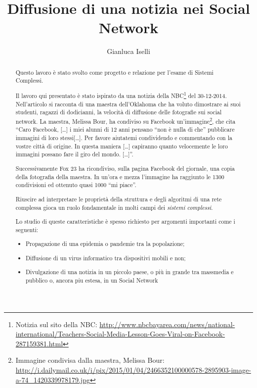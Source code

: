 \documentclass{llncs}
\begin{document}
\title{Diffusione di una notizia nei Social Network}
\author{Gianluca Iselli}

\maketitle

\begin{abstract}

Questo lavoro è stato svolto come progetto e relazione per l’esame di Sistemi Complessi.

Il lavoro qui presentato è stato ispirato da una notizia della 
NBC\footnote{\scriptsize Notizia sul sito della NBC: \url{http://www.nbcbayarea.com/news/national-international/Teachers-Social-Media-Lesson-Goes-Viral-on-Facebook-287159381.html}}
del 30-12-2014.
Nell'articolo si racconta di una maestra dell'Oklahoma che ha voluto dimostrare
ai suoi studenti, ragazzi di dodicianni, la velocità di diffusione delle fotografie sui social network. 
La maestra, Melissa Bour, ha condiviso su Facebook 
un'immagine\footnote{\scriptsize Immagine condivisa dalla maestra, 
Melissa Bour: \url{http://i.dailymail.co.uk/i/pix/2015/01/04/2466352100000578-2895903-image-a-74_1420339978179.jpg}}, che 
cita ``Caro Facebook, [\dots] i miei alunni di 12 anni pensano ``non è nulla di che'' pubblicare immagini di 
loro stessi[\dots]. Per favore aiutatemi condividendo e commentando con la vostre città di origine.
In questa maniera [\dots] capiranno quanto velocemente le loro immagini possano fare il giro del mondo. [\dots]''.

Successivamente Fox 23 ha ricondiviso, sulla pagina Facebook del giornale, 
una copia della fotografia della maestra. In un'ora e mezza l'immagine ha raggiunto 
le 1300 condivisioni ed ottenuto quasi 1000 ``mi piace''.

Riuscire ad interpretare le proprietà della struttura e degli algoritmi di una rete 
complessa gioca un ruolo fondamentale in molti campi dei \emph{sistemi complessi}.

Lo studio di queste caratteristiche è spesso richiesto per argomenti importanti come i seguenti:
\begin{itemize}
\item Propagazione di una epidemia o pandemie tra la popolazione;
\item Diffusione di un virus informatico tra dispositivi mobili e non;
\item Divulgazione di una notizia in un piccolo paese, 
o più in grande tra massmedia e pubblico o, ancora piu estesa, 
in un Social Network
\end{itemize}


\end{abstract}
\end{document}

